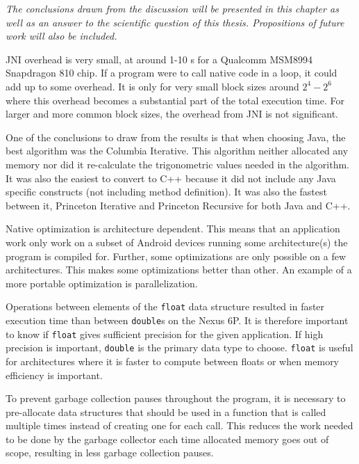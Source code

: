 \textit{The conclusions drawn from the discussion will be presented in this chapter as well as an answer to the scientific question of this thesis. Propositions of future work will also be included.}

JNI overhead is very small, at around 1-10 \textmu s for a Qualcomm MSM8994 Snapdragon 810 chip. If a program were to call native code in a loop, it could add up to some overhead. It is only for very small block sizes around $2^4 - 2^6$ where this overhead becomes a substantial part of the total execution time. For larger and more common block sizes, the overhead from JNI is not significant.

One of the conclusions to draw from the results is that when choosing Java, the best algorithm was the Columbia Iterative. This algorithm neither allocated any memory nor did it re-calculate the trigonometric values needed in the algorithm. It was also the easiest to convert to C++ because it did not include any Java specific constructs (not including method definition). It was also the fastest between it, Princeton Iterative and Princeton Recursive for both Java and C++.

Native optimization is architecture dependent. This means that an application work only work on a subset of Android devices running some architecture(s) the program is compiled for. Further, some optimizations are only possible on a few architectures. This makes some optimizations better than other. An example of a more portable optimization is parallelization.

Operations between elements of the \texttt{float} data structure resulted in faster execution time than between \texttt{double}s on the Nexus 6P. It is therefore important to know if \texttt{float} gives sufficient precision for the given application. If high precision is important, \texttt{double} is the primary data type to choose. \texttt{float} is useful for architectures where it is faster to compute between floats or when memory efficiency is important.

To prevent garbage collection pauses throughout the program, it is necessary to pre-allocate data structures that should be used in a function that is called multiple times instead of creating one for each call. This reduces the work needed to be done by the garbage collector each time allocated memory goes out of scope, resulting in less garbage collection pauses.

